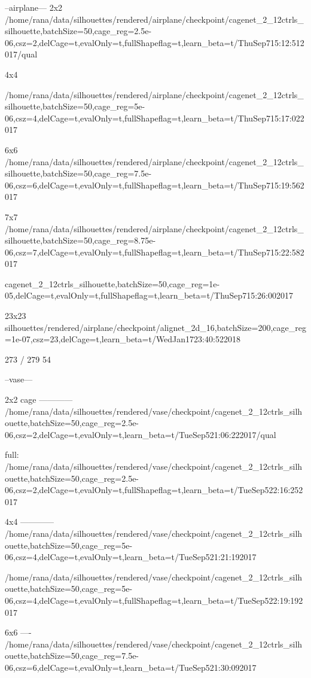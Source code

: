 \documentclass[acmtog,timestamp]{acmart}%
\begin{document}
--airplane---
2x2
/home/rana/data/silhouettes/rendered/airplane/checkpoint/cagenet_2_12ctrls_silhouette,batchSize=50,cage_reg=2.5e-06,csz=2,delCage=t,evalOnly=t,fullShapeflag=t,learn_beta=t/ThuSep715:12:512017/qual

4x4

/home/rana/data/silhouettes/rendered/airplane/checkpoint/cagenet_2_12ctrls_silhouette,batchSize=50,cage_reg=5e-06,csz=4,delCage=t,evalOnly=t,fullShapeflag=t,learn_beta=t/ThuSep715:17:022017

6x6
/home/rana/data/silhouettes/rendered/airplane/checkpoint/cagenet_2_12ctrls_silhouette,batchSize=50,cage_reg=7.5e-06,csz=6,delCage=t,evalOnly=t,fullShapeflag=t,learn_beta=t/ThuSep715:19:562017

7x7
/home/rana/data/silhouettes/rendered/airplane/checkpoint/cagenet_2_12ctrls_silhouette,batchSize=50,cage_reg=8.75e-06,csz=7,delCage=t,evalOnly=t,fullShapeflag=t,learn_beta=t/ThuSep715:22:582017


cagenet_2_12ctrls_silhouette,batchSize=50,cage_reg=1e-05,delCage=t,evalOnly=t,fullShapeflag=t,learn_beta=t/ThuSep715:26:002017

23x23
silhouettes/rendered/airplane/checkpoint/alignet_2d_16,batchSize=200,cage_reg=1e-07,csz=23,delCage=t,learn_beta=t/WedJan1723:40:522018



273 / 279
54

--vase---

2x2 cage
------------
/home/rana/data/silhouettes/rendered/vase/checkpoint/cagenet_2_12ctrls_silhouette,batchSize=50,cage_reg=2.5e-06,csz=2,delCage=t,evalOnly=t,learn_beta=t/TueSep521:06:222017/qual

full:
/home/rana/data/silhouettes/rendered/vase/checkpoint/cagenet_2_12ctrls_silhouette,batchSize=50,cage_reg=2.5e-06,csz=2,delCage=t,evalOnly=t,fullShapeflag=t,learn_beta=t/TueSep522:16:252017

4x4
------------
/home/rana/data/silhouettes/rendered/vase/checkpoint/cagenet_2_12ctrls_silhouette,batchSize=50,cage_reg=5e-06,csz=4,delCage=t,evalOnly=t,learn_beta=t/TueSep521:21:192017

/home/rana/data/silhouettes/rendered/vase/checkpoint/cagenet_2_12ctrls_silhouette,batchSize=50,cage_reg=5e-06,csz=4,delCage=t,evalOnly=t,fullShapeflag=t,learn_beta=t/TueSep522:19:192017

6x6
----
/home/rana/data/silhouettes/rendered/vase/checkpoint/cagenet_2_12ctrls_silhouette,batchSize=50,cage_reg=7.5e-06,csz=6,delCage=t,evalOnly=t,learn_beta=t/TueSep521:30:092017
\end{document}
